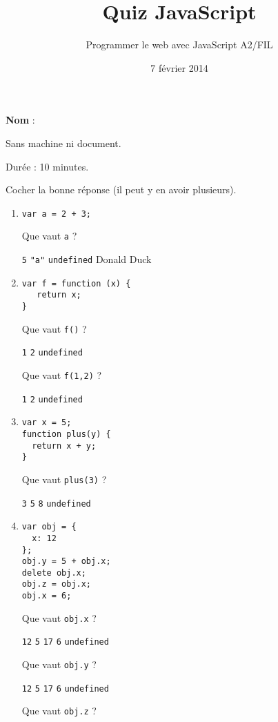\documentclass[a4paper, 12pt]{article}
\title{Quiz JavaScript}
\author{Programmer le web avec JavaScript A2/FIL}
\date{7 février 2014}
\newcommand{\choice}[1]{\Square\hspace{2pt} #1\hspace{5pt}}
\newcommand{\choicec}[1]{\Square\hspace{2pt} \lstinline{#1}\hspace{5pt}}
\begin{document}
\maketitle

\textbf{Nom} :

Sans machine ni document.

Durée : 10 minutes.

Cocher la bonne réponse (il peut y en avoir plusieurs).

\begin{enumerate}
\item \lstset{language=javascript}
\begin{lstlisting}
var a = 2 + 3;
\end{lstlisting}

  Que vaut \lstinline{a} ?

  \choicec{5} \choicec{"a"} \choicec{undefined} \choice{Donald Duck}
\item \lstset{language=javascript}
\begin{lstlisting}
var f = function (x) {
   return x;
}
\end{lstlisting}

   Que vaut \lstinline{f()} ?

   \choicec{1} \choicec{2} \choicec{undefined}

   Que vaut \lstinline{f(1,2)} ?

   \choicec{1} \choicec{2} \choicec{undefined}
\item \lstset{language=javascript}
\begin{lstlisting}
var x = 5;
function plus(y) {
  return x + y;
}
\end{lstlisting}

  Que vaut \lstinline{plus(3)} ?

  \choicec{3} \choicec{5} \choicec{8} \choicec{undefined}
\item \lstset{language=javascript}
\begin{lstlisting}
var obj = {
  x: 12
};
obj.y = 5 + obj.x;
delete obj.x;
obj.z = obj.x;
obj.x = 6;
\end{lstlisting}

  Que vaut \lstinline{obj.x} ?

  \choicec{12} \choicec{5} \choicec{17} \choicec{6} \choicec{undefined}

  Que vaut \lstinline{obj.y} ?

  \choicec{12} \choicec{5} \choicec{17} \choicec{6} \choicec{undefined}

  Que vaut \lstinline{obj.z} ?


\end{enumerate}
\end{document}
